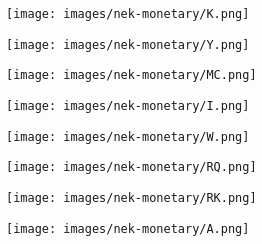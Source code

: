 \begin{center}
    \begin{minipage}{.3\textwidth}
      \centering
      \captionsetup{type=figure}
      \texttt{[image: images/nek-monetary/K.png]}
      \label{fig:nek-monetary:K}
    \end{minipage}%
    \begin{minipage}{.3\textwidth}
      \centering
      \captionsetup{type=figure}
      \texttt{[image: images/nek-monetary/Y.png]}
      \label{fig:nek-monetary:Y}
    \end{minipage}
    \begin{minipage}{.3\textwidth}
      \centering
      \captionsetup{type=figure}
      \texttt{[image: images/nek-monetary/MC.png]}
      \label{fig:nek-monetary:MC}
    \end{minipage}
\end{center}

\begin{center}
    \begin{minipage}{.3\textwidth}
      \centering
      \captionsetup{type=figure}
      \texttt{[image: images/nek-monetary/I.png]}
      \label{fig:nek-monetary:I}
    \end{minipage}%
    \begin{minipage}{.3\textwidth}
      \centering
      \captionsetup{type=figure}
      \texttt{[image: images/nek-monetary/W.png]}
      \label{fig:nek-monetary:W}
    \end{minipage}
    \begin{minipage}{.3\textwidth}
      \centering
      \captionsetup{type=figure}
      \texttt{[image: images/nek-monetary/RQ.png]}
      \label{fig:nek-monetary:RQ}
    \end{minipage}
\end{center}

\begin{center}
    \begin{minipage}{.4\textwidth}
      \centering
      \captionsetup{type=figure}
      \texttt{[image: images/nek-monetary/RK.png]}
      \label{fig:nek-monetary:RK}
    \end{minipage}%
    \begin{minipage}{.4\textwidth}
      \centering
      \captionsetup{type=figure}
      \texttt{[image: images/nek-monetary/A.png]}
      \label{fig:nek-monetary:A}
    \end{minipage}
\end{center}

